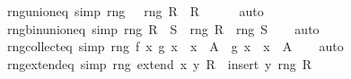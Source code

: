 \begin{isabellebody}
\isanewline
{}\isamarkupfalse%
\ rng{\isacharunderscore}{\kern0pt}union{\isacharunderscore}{\kern0pt}eq\ {\isacharbrackleft}{\kern0pt}simp{\isacharbrackright}{\kern0pt}{\isacharcolon}{\kern0pt}\ {\isachardoublequoteopen}rng\ {\isacharparenleft}{\kern0pt}{\isasymUnion}{\isasymR}{\isacharparenright}{\kern0pt}\ {\isacharequal}{\kern0pt}\ {\isasymUnion}{\isacharbraceleft}{\kern0pt}rng\ R\ {\isacharbar}{\kern0pt}\ R\ {\isasymin}\ {\isasymR}{\isacharbraceright}{\kern0pt}{\isachardoublequoteclose}\isanewline
%
\isadelimproof
\ \ %
\endisadelimproof
%
\isatagproof
{}\isamarkupfalse%
\ auto%
\endisatagproof
{\isafoldproof}%
%
\isadelimproof
\isanewline
%
\endisadelimproof
\isanewline
{}\isamarkupfalse%
\ rng{\isacharunderscore}{\kern0pt}bin{\isacharunderscore}{\kern0pt}union{\isacharunderscore}{\kern0pt}eq\ {\isacharbrackleft}{\kern0pt}simp{\isacharbrackright}{\kern0pt}{\isacharcolon}{\kern0pt}\ {\isachardoublequoteopen}rng\ {\isacharparenleft}{\kern0pt}R\ {\isasymunion}\ S{\isacharparenright}{\kern0pt}\ {\isacharequal}{\kern0pt}\ rng\ R\ {\isasymunion}\ rng\ S{\isachardoublequoteclose}\isanewline
%
\isadelimproof
\ \ %
\endisadelimproof
%
\isatagproof
{}\isamarkupfalse%
\ auto%
\endisatagproof
{\isafoldproof}%
%
\isadelimproof
\isanewline
%
\endisadelimproof
\isanewline
{}\isamarkupfalse%
\ rng{\isacharunderscore}{\kern0pt}collect{\isacharunderscore}{\kern0pt}eq\ {\isacharbrackleft}{\kern0pt}simp{\isacharbrackright}{\kern0pt}{\isacharcolon}{\kern0pt}\ {\isachardoublequoteopen}rng\ {\isacharbraceleft}{\kern0pt}{\isasymlangle}f\ x{\isacharcomma}{\kern0pt}\ g\ x{\isasymrangle}\ {\isacharbar}{\kern0pt}\ x\ {\isasymin}\ A{\isacharbraceright}{\kern0pt}\ {\isacharequal}{\kern0pt}\ {\isacharbraceleft}{\kern0pt}g\ x\ {\isacharbar}{\kern0pt}\ x\ {\isasymin}\ A{\isacharbraceright}{\kern0pt}{\isachardoublequoteclose}\isanewline
%
\isadelimproof
\ \ %
\endisadelimproof
%
\isatagproof
{}\isamarkupfalse%
\ auto%
\endisatagproof
{\isafoldproof}%
%
\isadelimproof
\isanewline
%
\endisadelimproof
\isanewline
{}\isamarkupfalse%
\ rng{\isacharunderscore}{\kern0pt}extend{\isacharunderscore}{\kern0pt}eq\ {\isacharbrackleft}{\kern0pt}simp{\isacharbrackright}{\kern0pt}{\isacharcolon}{\kern0pt}\ {\isachardoublequoteopen}rng\ {\isacharparenleft}{\kern0pt}extend\ x\ y\ R{\isacharparenright}{\kern0pt}\ {\isacharequal}{\kern0pt}\ insert\ y\ {\isacharparenleft}{\kern0pt}rng\ R{\isacharparenright}{\kern0pt}{\isachardoublequoteclose}\isanewline
%
\isadelimproof
\ \ %
\endisadelimproof
%
\isatagproof

\end{isabellebody}

